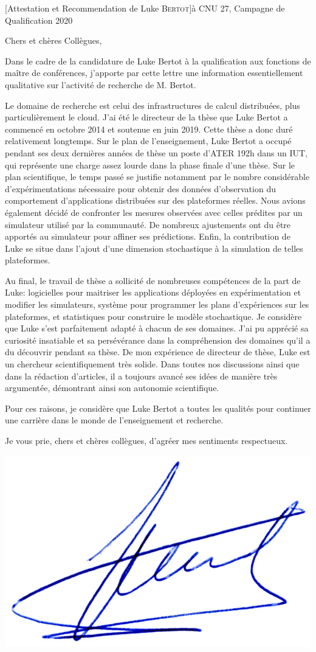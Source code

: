 \documentclass[a4paper,10pt]{article}
\begin{document}

\begin{letter}[Attestation et Recommendation de Luke \textsc{Bertot}]{à}%
{CNU 27, Campagne de Qualification 2020}

Chers et chères Collègues,

Dans le cadre de la candidature de  Luke Bertot à la qualification aux fonctions
de  maître   de  conférences,  j'apporte   par  cette  lettre   une  information
essentiellement qualitative sur l'activité de recherche de M. Bertot.  

Le domaine  de recherche  est celui des  infrastructures de  calcul distribuées,
plus  particulièrement le  cloud. J'ai  été le  directeur de  la thèse  que Luke
Bertot a commencé en octobre 2014 et  soutenue en juin 2019.  Cette thèse a donc
duré relativement longtemps. Sur le plan de l'enseignement, Luke Bertot a occupé
pendant ses deux dernières années de thèse un poste d'ATER 192h dans un IUT, qui
représente une  charge assez lourde  dans la phase  finale d'une thèse.   Sur le
plan  scientifique,  le  temps  passé   se  justifie  notamment  par  le  nombre
considérable   d'expérimentations   nécessaire    pour   obtenir   des   données
d'observation  du comportement  d'applications distribuées  sur des  plateformes
réelles. Nous avions  également décidé de confronter les  mesures observées avec
celles  prédites par  un  simulateur  utilisé par  la  communauté.  De  nombreux
ajustements ont  du être  apportés au simulateur  pour affiner  ses prédictions.
Enfin,  la  contribution   de  Luke  se  situe  dans   l'ajout  d'une  dimension
stochastique à la simulation de telles plateformes.

Au final, le travail  de thèse a sollicité de nombreuses  compétences de la part
de   Luke:   logicielles   pour   maitriser  les   applications   déployées   en
expérimentation et modifier  les simulateurs, système pour  programmer les plans
d'expériences sur  les plateformes,  et statistiques  pour construire  le modèle
stochastique. Je  considère que Luke s'est  parfaitement adapté à chacun  de ses
domaines. J'ai  pu apprécié sa curiosité  insatiable et sa persévérance  dans la
compréhension  des domaines  qu'il  a  du découvrir  pendant  sa  thèse. De  mon
expérience de  directeur de thèse,  Luke est un chercheur  scientifiquement très
solide. Dans toutes nos discussions ainsi que dans la rédaction d'articles, il a
toujours  avancé ses  idées de  manière  très argumentée,  démontrant ainsi  son
autonomie scientifique.

Pour  ces raisons,  je considère  que  Luke Bertot  a toutes  les qualités  pour
continuer une carrière dans le monde de l'enseignement et recherche.

Je vous prie, chers et chères collègues, d'agréer mes sentiments respectueux.
\end{letter}
\begin{flushright}
\includegraphics[width=.2\textwidth]{signgenaud.jpg}
\end{flushright}
\end{document}

